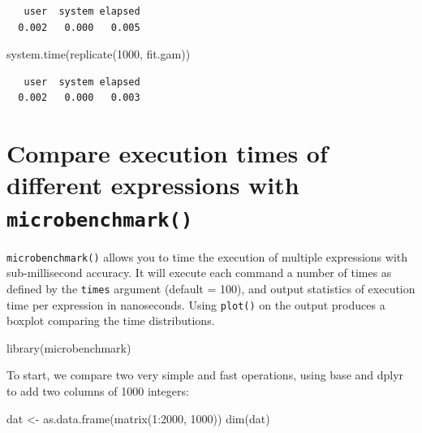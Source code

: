 \documentclass[
]{book}
\newenvironment{Shaded}{\begin{snugshade}}{\end{snugshade}}
\newcommand{\DecValTok}[1]{\textcolor[rgb]{0.00,0.00,0.81}{#1}}
\newcommand{\FunctionTok}[1]{\textcolor[rgb]{0.00,0.00,0.00}{#1}}
\newcommand{\NormalTok}[1]{#1}
\newcommand{\OtherTok}[1]{\textcolor[rgb]{0.56,0.35,0.01}{#1}}
\newcommand{\SpecialCharTok}[1]{\textcolor[rgb]{0.00,0.00,0.00}{#1}}
\begin{document}
\begin{verbatim}
   user  system elapsed 
  0.002   0.000   0.005 
\end{verbatim}

\begin{Shaded}
\begin{Highlighting}[]
\FunctionTok{system.time}\NormalTok{(}\FunctionTok{replicate}\NormalTok{(}\DecValTok{1000}\NormalTok{, fit.gam))}
\end{Highlighting}
\end{Shaded}

\begin{verbatim}
   user  system elapsed 
  0.002   0.000   0.003 
\end{verbatim}

\hypertarget{compare-execution-times-of-different-expressions-with-microbenchmark}{%
\section{\texorpdfstring{Compare execution times of different expressions with \texttt{microbenchmark()}}{Compare execution times of different expressions with microbenchmark()}}\label{compare-execution-times-of-different-expressions-with-microbenchmark}}

\texttt{microbenchmark()} allows you to time the execution of multiple expressions with sub-millisecond accuracy. It will execute each command a number of times as defined by the \texttt{times} argument (default = 100), and output statistics of execution time per expression in nanoseconds. Using \texttt{plot()} on the output produces a boxplot comparing the time distributions.

\begin{Shaded}
\begin{Highlighting}[]
\FunctionTok{library}\NormalTok{(microbenchmark)}
\end{Highlighting}
\end{Shaded}

To start, we compare two very simple and fast operations, using base and dplyr to add two columns of 1000 integers:

\begin{Shaded}
\begin{Highlighting}[]
\NormalTok{dat }\OtherTok{\textless{}{-}} \FunctionTok{as.data.frame}\NormalTok{(}\FunctionTok{matrix}\NormalTok{(}\DecValTok{1}\SpecialCharTok{:}\DecValTok{2000}\NormalTok{, }\DecValTok{1000}\NormalTok{))}
\FunctionTok{dim}\NormalTok{(dat)}
\end{Highlighting}
\end{Shaded}
\end{document}
